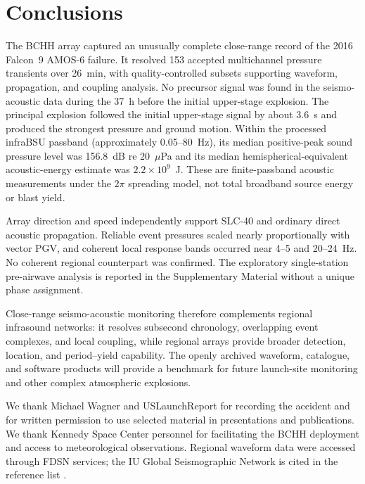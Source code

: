 \documentclass[]{seismica}
\begin{document}
\section{Conclusions}
\label{sec:conclusions}

The BCHH array captured an unusually complete close-range record of the 2016
Falcon~9 AMOS-6 failure. It resolved 153 accepted multichannel pressure
transients over 26~min, with quality-controlled subsets supporting waveform,
propagation, and coupling analysis. No precursor signal was found in the
seismo-acoustic data during the 37~h before the initial upper-stage explosion. The principal explosion followed
the initial upper-stage signal by about 3.6~s and produced the strongest pressure
and ground motion. Within the processed infraBSU passband (approximately
0.05--80~Hz), its median positive-peak sound pressure level was 156.8~dB re
20~$\mu$Pa and its median hemispherical-equivalent acoustic-energy estimate was
$2.2\times10^9$~J. These are
finite-passband acoustic measurements under the $2\pi$ spreading model, not
total broadband source energy or blast yield.

Array direction and speed independently support SLC-40 and ordinary direct
acoustic propagation. Reliable event pressures scaled nearly proportionally
with vector PGV, and coherent local response bands occurred near 4--5 and
20--24~Hz. No coherent regional counterpart was confirmed. The exploratory
single-station pre-airwave analysis is reported in the Supplementary Material
without a unique phase assignment.

Close-range seismo-acoustic monitoring therefore complements regional
infrasound networks: it resolves subsecond chronology, overlapping event
complexes, and local coupling, while regional arrays provide broader detection,
location, and period--yield capability. The openly archived waveform,
catalogue, and software products will provide a benchmark for future
launch-site monitoring and other complex atmospheric explosions.

\begin{acknowledgements}
We thank Michael Wagner and USLaunchReport for recording the accident and for
written permission to use selected material in presentations and publications.
We thank Kennedy Space Center personnel for facilitating the BCHH deployment
and access to meteorological observations. Regional waveform data were
accessed through FDSN services; the IU Global Seismographic Network is cited
in the reference list \citep{asl_gsn_iu_1988}.
\end{acknowledgements}
\end{document}

